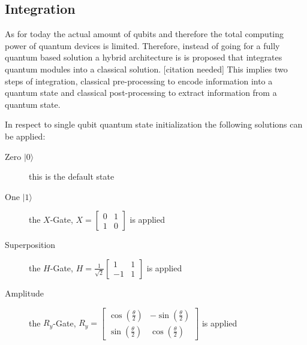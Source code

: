 \subsection{Integration}
As for today the actual amount of qubits and therefore the total computing power of quantum devices is limited. Therefore, instead of going for a fully quantum based solution a hybrid architecture is is proposed that integrates quantum modules into a classical solution. [citation needed] This implies two steps of integration, classical pre-processing to encode information into a quantum state and classical post-processing to extract information from a quantum state.

In respect to single qubit quantum state initialization the following solutions can be applied:
\begin{description}
  \item [Zero $|0\rangle$] this is the default state
  \item [One $|1\rangle$] the $X$-Gate, $X = \begin{bmatrix}0 & 1 \\ 1 & 0\end{bmatrix}$ is applied
  \item [Superposition] the $H$-Gate, $H = \frac{1}{\sqrt{2}}\begin{bmatrix}1 & 1 \\ -1 & 1\end{bmatrix}$ is applied
  \item [Amplitude] the $R_y$-Gate, $R_y = \begin{bmatrix}\cos(\frac{\theta}{2}) & -\sin(\frac{\theta}{2}) \\ \sin(\frac{\theta}{2}) & \cos(\frac{\theta}{2})\end{bmatrix}$ is applied
\end{description}

